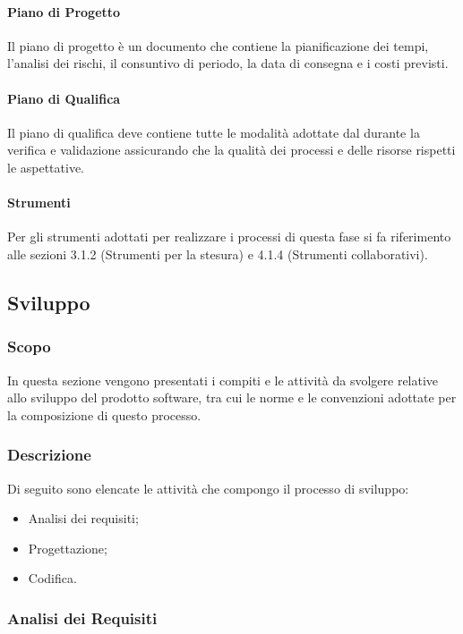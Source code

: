 \paragraph{Piano di Progetto}
Il piano di progetto è un documento che contiene la pianificazione dei tempi, l'analisi dei rischi, il consuntivo di periodo, la data di consegna e i costi previsti.

\paragraph{Piano di Qualifica}
Il piano di qualifica deve contiene tutte le modalità adottate dal \roleVerifier{} durante la verifica e validazione assicurando che la qualità dei processi e delle risorse rispetti le aspettative. 

\paragraph{Strumenti}
Per gli strumenti adottati per realizzare i processi di questa fase si fa riferimento alle sezioni 3.1.2 (Strumenti per la stesura) e 4.1.4 (Strumenti collaborativi).  

\subsection{Sviluppo}
\subsubsection{Scopo}
In questa sezione vengono presentati i compiti e le attività da svolgere relative allo sviluppo del prodotto software, tra cui le norme e le convenzioni adottate per la composizione di questo processo.

\subsubsection{Descrizione}
Di seguito sono elencate le attività che compongo il processo di sviluppo:
\begin{itemize}
\item Analisi dei requisiti;
\item Progettazione;
\item Codifica.
\end{itemize}

\subsubsection{Analisi dei Requisiti}
